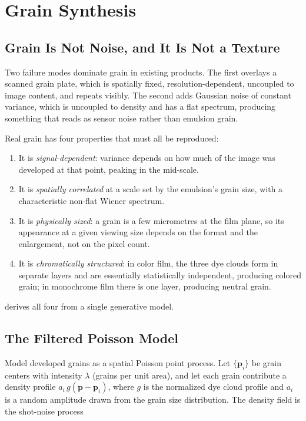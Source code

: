 \section{Grain Synthesis}
\label{sec:grain}

\subsection{Grain Is Not Noise, and It Is Not a Texture}

Two failure modes dominate grain in existing products. The first overlays a
scanned grain plate, which is spatially fixed, resolution-dependent, uncoupled
to image content, and repeats visibly. The second adds Gaussian noise of
constant variance, which is uncoupled to density and has a flat spectrum,
producing something that reads as sensor noise rather than emulsion grain.

Real grain has four properties that must all be reproduced:

\begin{enumerate}
\item It is \emph{signal-dependent}: variance depends on how much of the image
was developed at that point, peaking in the mid-scale.
\item It is \emph{spatially correlated} at a scale set by the emulsion's grain
size, with a characteristic non-flat Wiener spectrum.
\item It is \emph{physically sized}: a grain is a few micrometres at the film
plane, so its appearance at a given viewing size depends on the format and the
enlargement, not on the pixel count.
\item It is \emph{chromatically structured}: in color film, the three dye
clouds form in separate layers and are essentially statistically independent,
producing colored grain; in monochrome film there is one layer, producing
neutral grain.
\end{enumerate}

\EM{} derives all four from a single generative model.

\subsection{The Filtered Poisson Model}

Model developed grains as a spatial Poisson point process. Let $\{\mathbf{p}_i\}$
be grain centers with intensity $\lambda$ (grains per unit area), and let each
grain contribute a density profile $a_i\, g(\mathbf{p} - \mathbf{p}_i)$, where
$g$ is the normalized dye cloud profile and $a_i$ is a random amplitude drawn
from the grain size distribution. The density field is the shot-noise process

